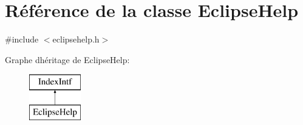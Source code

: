 \hypertarget{class_eclipse_help}{}\section{Référence de la classe Eclipse\+Help}
\label{class_eclipse_help}


{\ttfamily \#include $<$eclipsehelp.\+h$>$}

Graphe d\textquotesingle{}héritage de Eclipse\+Help\+:\begin{figure}[H]
\begin{center}
\leavevmode
\includegraphics[height=2.000000cm]{class_eclipse_help}
\end{center}
\end{figure}
